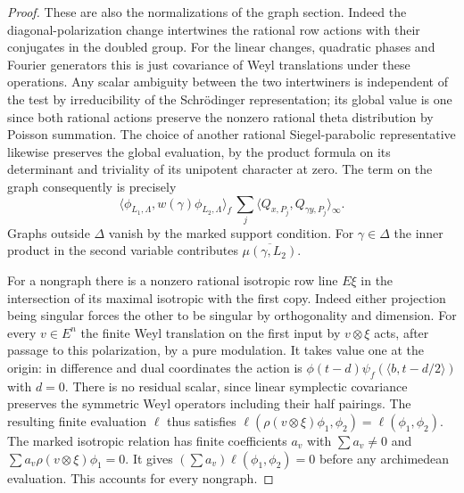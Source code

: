 \begin{proof}
These are also the normalizations of the graph section. Indeed the
diagonal-polarization change intertwines the rational row actions
with their conjugates in the doubled group. For the linear changes,
quadratic phases and Fourier generators this is just covariance
of Weyl translations under these operations. Any scalar ambiguity
between the two intertwiners is independent of the test by
irreducibility of the Schrödinger representation; its global value
is one since both rational actions preserve the nonzero rational
theta distribution by Poisson summation. The choice of another
rational Siegel-parabolic representative likewise preserves the
global evaluation, by the product formula on its determinant and
triviality of its unipotent character at zero. The term on the
graph consequently is precisely
\[
 \langle\phi_{L_1,\Lambda},w(\gamma)\phi_{L_2,\Lambda}\rangle_f\,
          \sum_j\langle Q_{x,P_j},Q_{\gamma y,P_j}\rangle_\infty .
\]
Graphs outside $\Delta$ vanish by the marked support condition.
For $\gamma\in\Delta$ the inner product in the second variable
contributes $\overline{\mu(\gamma,L_2)}$.

For a nongraph there is a nonzero rational isotropic row line
$E\xi$ in the intersection of its maximal isotropic with the first
copy. Indeed either projection being singular forces the other to
be singular by orthogonality and dimension. For every $v\in E^n$
the finite Weyl translation on the first input by $v\otimes\xi$ acts,
after passage to this polarization, by a pure modulation. It takes
value one at the origin: in difference and dual coordinates the
action is $\phi(t-d)\psi_f(\langle b,t-d/2\rangle)$ with $d=0$.
There is no residual scalar, since linear symplectic covariance
preserves the symmetric Weyl operators including their half
pairings. The resulting finite evaluation $\ell$ thus satisfies
$\ell(\rho(v\otimes\xi)\phi_1,\phi_2)=\ell(\phi_1,\phi_2)$.
The marked isotropic relation has finite coefficients $a_v$ with
$\sum a_v\ne0$ and $\sum a_v\rho(v\otimes\xi)\phi_1=0$.
It gives $(\sum a_v)\ell(\phi_1,\phi_2)=0$ before any
archimedean evaluation. This accounts for every nongraph.


\end{proof}
